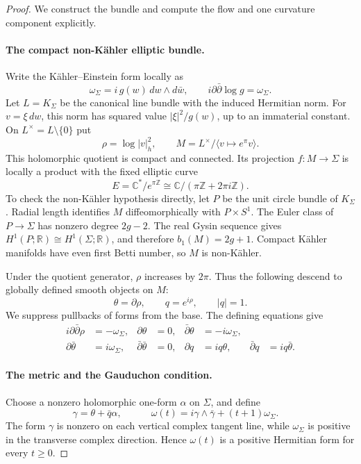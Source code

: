 \documentclass[11pt,a4paper]{article}
\theoremstyle{remark}
\begin{document}
\begin{proof}
We construct the bundle and compute the flow and one curvature component explicitly.

\paragraph{The compact non-K\"ahler elliptic bundle.}
Write the K\"ahler--Einstein form locally as
\[
\omega_\Sigma=i\,g(w)\,dw\wedge d\bar w,
\qquad i\partial\bar\partial\log g=\omega_\Sigma.
\]
Let $L=K_\Sigma$ be the canonical line bundle with the induced Hermitian norm. For $v=\xi\,dw$, this norm has squared value $|\xi|^2/g(w)$, up to an immaterial constant. On $L^\times=L\setminus\{0\}$ put
\[
\rho=\log|v|_h^2,
\qquad
M=L^\times/\langle v\mapsto e^\pi v\rangle.
\]
This holomorphic quotient is compact and connected. Its projection $f:M\to\Sigma$ is locally a product with the fixed elliptic curve
\[
E=\mathbb C^*/e^{\pi\mathbb Z}
\cong\mathbb C/(\pi\mathbb Z+2\pi i\mathbb Z).
\]
To check the non-K\"ahler hypothesis directly, let $P$ be the unit circle bundle of $K_\Sigma$. Radial length identifies $M$ diffeomorphically with $P\times S^1$. The Euler class of $P\to\Sigma$ has nonzero degree $2g-2$. The real Gysin sequence gives $H^1(P;\mathbb R)\cong H^1(\Sigma;\mathbb R)$, and therefore $b_1(M)=2g+1$. Compact K\"ahler manifolds have even first Betti number, so $M$ is non-K\"ahler.

Under the quotient generator, $\rho$ increases by $2\pi$. Thus the following descend to globally defined smooth objects on $M$:
\[
\theta=\partial\rho,
\qquad q=e^{i\rho},\qquad |q|=1.
\]
We suppress pullbacks of forms from the base. The defining equations give
\begin{align}
i\partial\bar\partial\rho&=-\omega_\Sigma,
&\partial\theta&=0,
&\bar\partial\theta&=-i\omega_\Sigma,
\label{eq:707-struct1}\\
\partial\bar\theta&=i\omega_\Sigma,
&\bar\partial\bar\theta&=0,
&\partial q&=iq\theta,
&\bar\partial q&=iq\bar\theta.
\label{eq:707-struct2}
\end{align}

\paragraph{The metric and the Gauduchon condition.}
Choose a nonzero holomorphic one-form $\alpha$ on $\Sigma$, and define
\[
\gamma=\theta+\bar q\alpha,
\qquad
\boxed{\quad \omega(t)=i\gamma\wedge\bar\gamma+(t+1)\omega_\Sigma.\quad}
\tag{707.1}\label{eq:707-flow}
\]
The form $\gamma$ is nonzero on each vertical complex tangent line, while $\omega_\Sigma$ is positive in the transverse complex direction. Hence $\omega(t)$ is a positive Hermitian form for every $t\ge0$.


\end{proof}
\end{document}
